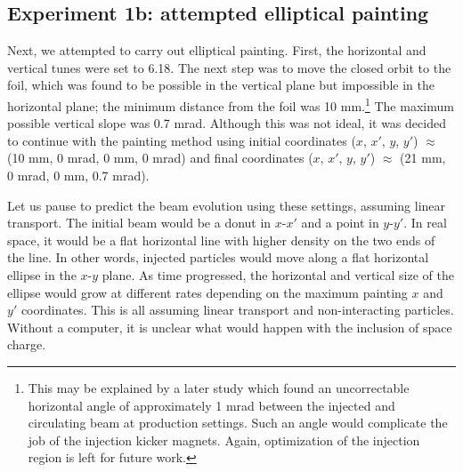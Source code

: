 \subsection{Experiment 1b: attempted elliptical painting}

Next, we attempted to carry out elliptical painting. First, the horizontal and vertical tunes were set to 6.18. The next step was to move the closed orbit to the foil, which was found to be possible in the vertical plane but impossible in the horizontal plane; the minimum distance from the foil was 10 mm.\footnote{This may be explained by a later study which found an uncorrectable horizontal angle of approximately 1 mrad between the injected and circulating beam at production settings. Such an angle would complicate the job of the injection kicker magnets. Again, optimization of the injection region is left for future work.} The maximum possible vertical slope was 0.7 mrad. Although this was not ideal, it was decided to continue with the painting method using initial coordinates ($x$, $x'$, $y$, $y'$) $\approx$ (10 mm, 0 mrad, 0 mm, 0 mrad) and final coordinates ($x$, $x'$, $y$, $y'$) $\approx$ (21 mm, 0 mrad, 0 mm, 0.7 mrad).

Let us pause to predict the beam evolution using these settings, assuming linear transport. The initial beam would be a donut in $x$-$x'$ and a point in $y$-$y'$. In real space, it would be a flat horizontal line with higher density on the two ends of the line. In other words, injected particles would move along a flat horizontal ellipse in the $x$-$y$ plane. As time progressed, the horizontal and vertical size of the ellipse would grow at different rates depending on the maximum painting $x$ and $y'$ coordinates. This is all assuming linear transport and non-interacting particles. Without a computer, it is unclear what would happen with the inclusion of space charge.

